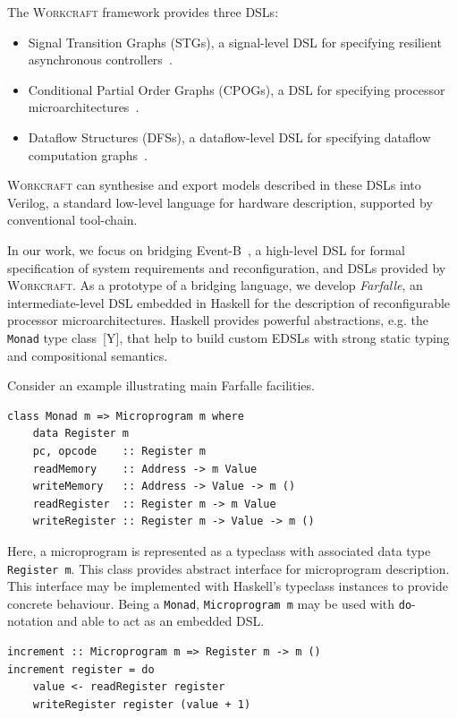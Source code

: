 \documentclass[conference]{IEEEtran}
\begin{document}
The \textsc{Workcraft} framework provides three DSLs:

\begin{itemize}
\item Signal Transition Graphs (STGs), a signal-level DSL for
specifying resilient asynchronous controllers~\cite{STG}.
\item Conditional Partial Order Graphs (CPOGs), a DSL for specifying
processor microarchitectures~\cite{ISA-formal}.
\item Dataflow Structures (DFSs), a dataflow-level DSL
for specifying dataflow computation graphs~\cite{DFS}.
\end{itemize}

\textsc{Workcraft} can synthesise and export models described in these DSLs into
Verilog, a standard low-level language for hardware description, supported
by conventional tool-chain.

In our work, we focus on bridging Event-B~\cite{EventB}, a high-level DSL
for formal specification of system requirements and reconfiguration,
and DSLs provided by \textsc{Workcraft}. As a prototype of a bridging language,
we develop \emph{Farfalle}, an intermediate-level DSL embedded in Haskell for
the description of reconfigurable processor microarchitectures.
Haskell provides powerful abstractions, e.g. the \texttt{Monad} type class~[Y],
that help to build custom EDSLs with strong static typing and compositional
semantics.

Consider an example illustrating main Farfalle facilities.

\begin{verbatim}
class Monad m => Microprogram m where
    data Register m
    pc, opcode    :: Register m
    readMemory    :: Address -> m Value
    writeMemory   :: Address -> Value -> m ()
    readRegister  :: Register m -> m Value
    writeRegister :: Register m -> Value -> m ()
\end{verbatim}

Here, a microprogram is represented as a typeclass with associated
data type \texttt{Register m}. This class provides abstract interface for
microprogram description. This interface may be
implemented with Haskell's typeclass instances to provide concrete behaviour.
Being a \texttt{Monad}, \texttt{Microprogram m} may be used with
\texttt{do}-notation and able to act as an embedded DSL.

\begin{verbatim}
increment :: Microprogram m => Register m -> m ()
increment register = do
    value <- readRegister register
    writeRegister register (value + 1)
\end{verbatim}
\end{document}
